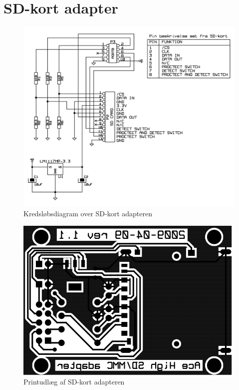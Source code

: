 \chapter{SD-kort adapter}
\label{ch:b-sd}

\begin{figure}[htbp]
  \centering
  \includegraphics[width=\textwidth]{./img/sd-kort-adapter-diagram}
  \caption{Kredsløbsdiagram over SD-kort adapteren}
  \label{fig:label-her}
\end{figure}


\begin{figure}[htbp]
  \centering
  \includegraphics{./img/sd-kort-adapter-kobber}
  \caption{Printudlæg af SD-kort adapteren}
  \label{fig:label-her}
\end{figure}

